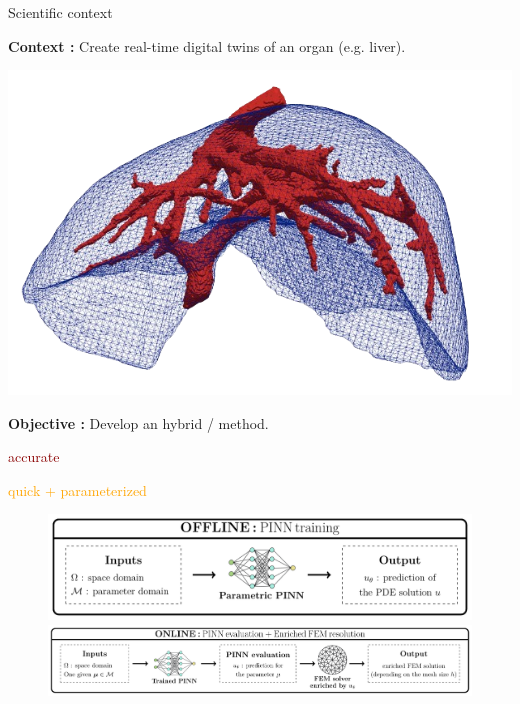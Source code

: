 \begin{frame}{Scientific context}
	\begin{minipage}{0.75\linewidth}
		\textbf{Context :} Create real-time digital twins of an organ (e.g. liver).
	\end{minipage}
	\begin{minipage}{0.21\linewidth}
		\vspace{-20pt}
		\includegraphics[width=\linewidth]{images/intro/liver.png}
	\end{minipage}
	
	\vspace{5pt}
	\textbf{Objective :} Develop an hybrid  /  method.
	
	\vspace{1pt}
	\small
	\hspace{130pt} \begin{minipage}{0.14\linewidth}
		\textcolor{darkred}{accurate}
	\end{minipage} \hspace{8pt} \begin{minipage}{0.3\linewidth}
		\textcolor{orange}{quick + parameterized}
	\end{minipage}

	\begin{figure}[!ht]
		\centering
		\includegraphics[width=0.7\linewidth]{images/intro/pipeline/offline.pdf}

		\includegraphics[width=\linewidth]{images/intro/pipeline/online.pdf}
	\end{figure}
\end{frame}

